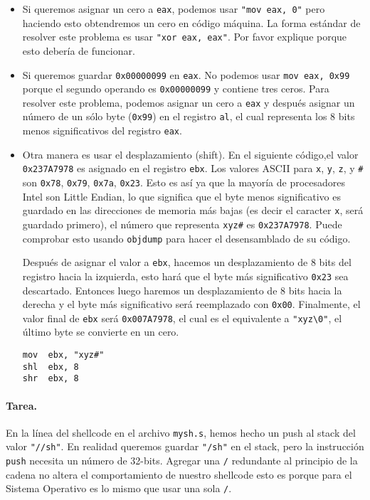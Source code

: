 \begin{itemize}
\item Si queremos asignar un cero a \texttt{eax}, podemos usar \texttt{"mov eax, 0"} pero haciendo esto obtendremos un cero en código máquina. La forma estándar de resolver este problema es usar \texttt{"xor eax, eax"}. 
Por favor explique porque esto debería de funcionar.

\item Si queremos guardar \texttt{0x00000099} en \texttt{eax}. No podemos usar \texttt{mov eax, 0x99} porque el segundo operando es \texttt{0x00000099} y contiene tres ceros. Para resolver este problema, podemos asignar un cero a \texttt{eax} y después asignar un número de un sólo byte (\texttt{0x99}) en el registro \texttt{al}, el cual representa los 8 bits menos significativos del registro \texttt{eax}.

\item Otra manera es usar el desplazamiento (shift). En el siguiente código,el valor \texttt{0x237A7978} es asignado en el registro \texttt{ebx}. Los valores   ASCII para \texttt{x}, \texttt{y}, \texttt{z}, y \texttt{\#} son \texttt{0x78}, \texttt{0x79}, \texttt{0x7a}, \texttt{0x23}. Esto es así ya que la mayoría de procesadores Intel son Little Endian, lo que significa que el byte menos significativo es guardado en las direcciones de memoria más bajas (es decir el caracter  \texttt{x}, será guardado primero), el número que representa \texttt{xyz\#} es \texttt{0x237A7978}. Puede comprobar esto usando \texttt{objdump} para hacer el desensamblado de su código.

Después de asignar el valor a \texttt{ebx}, hacemos un desplazamiento de 8 bits del registro hacia la izquierda, esto hará que el byte más significativo \texttt{0x23} sea descartado. Entonces luego haremos un desplazamiento de 8 bits hacia la derecha y el byte más significativo será reemplazado con \texttt{0x00}. 
Finalmente, el valor final de \texttt{ebx} será \texttt{0x007A7978}, el cual es el equivalente a \texttt{"xyz\textbackslash 0"}, el último byte se convierte en un cero.

\begin{lstlisting}
mov  ebx, "xyz#"
shl  ebx, 8
shr  ebx, 8
\end{lstlisting}
\end{itemize}


\paragraph{Tarea.}
En la línea  del shellcode en el archivo \texttt{mysh.s}, hemos hecho un push al stack del valor \texttt{"//sh"}. En realidad queremos guardar \texttt{"/sh"} en el stack, pero la instrucción \texttt{push} necesita un número de 32-bits.
Agregar una \texttt{/} redundante al principio de la cadena no altera el comportamiento de nuestro shellcode esto es porque para el Sistema Operativo es lo mismo que usar una sola \texttt{/}.

